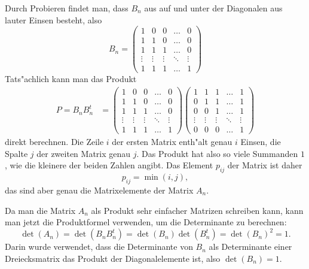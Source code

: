 \begin{loesung}
Durch Probieren findet man, dass $B_n$ aus auf und unter der Diagonalen aus
lauter Einsen besteht, also
\[
B_n
=
\begin{pmatrix}
     1&     0&     0&\dots &     0\\
     1&     1&     0&\dots &     0\\
     1&     1&     1&\dots &     0\\
\vdots&\vdots&\vdots&\ddots&\vdots\\
     1&     1&     1&\dots &     1
\end{pmatrix}
\]
Tats"achlich kann man das Produkt
\begin{align*}
P=B_nB_n^t
&=
\begin{pmatrix}
     1&     0&     0&\dots &     0\\
     1&     1&     0&\dots &     0\\
     1&     1&     1&\dots &     0\\
\vdots&\vdots&\vdots&\ddots&\vdots\\
     1&     1&     1&\dots &     1
\end{pmatrix}
\begin{pmatrix}
     1&     1&     1&\dots &     1\\
     0&     1&     1&\dots &     1\\
     0&     0&     1&\dots &     1\\
\vdots&\vdots&\vdots&\ddots&\vdots\\
     0&     0&     0&\dots &     1
\end{pmatrix}
\end{align*}
direkt berechnen.
Die Zeile $i$ der ersten Matrix enth"alt genau $i$ Einsen, die Spalte $j$ 
der zweiten Matrix genau $j$.
Das Produkt hat also so viele Summanden $1$, wie die kleinere der beiden
Zahlen angibt.
Das Element $p_{ij}$ der Matrix ist daher
\[
p_{ij}=\min(i,j),
\]
das sind aber genau die Matrixelemente der Matrix $A_n$.

Da man die Matrix $A_n$ als Produkt sehr einfacher Matrizen schreiben kann,
kann man jetzt die Produktformel verwenden, um die Determinante zu berechnen:
\[
\det(A_n)=\det(B_nB_n^t)=\det(B_n)\det(B_n^t)=\det(B_n)^2=1.
\]
Darin wurde verwendet, dass die Determinante von $B_n$ als Determinante
einer Dreiecksmatrix das Produkt der Diagonalelemente ist, also
$\det(B_n)=1$. 
\end{loesung}
